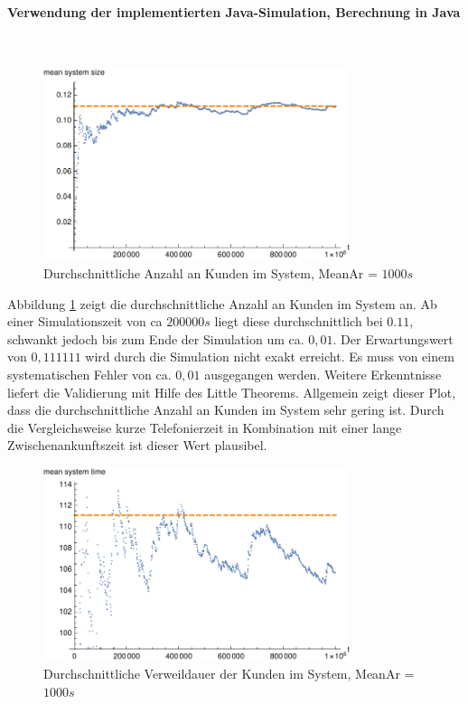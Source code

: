 \paragraph{Verwendung der implementierten Java-Simulation, Berechnung in Java}
\label{JavaOnePhone1000}
\\
\begin{figure}[htpb]
	\centering
	\includegraphics[width=0.8\textwidth]{abbildungen/1_Phone/Arrival_1000_Serve_100_dur_1000000_Skip_0/MeanSystemSize.pdf}
	\caption{Durchschnittliche Anzahl an Kunden im System, MeanAr = $1000s$}
	\label{fig:meanSystemSize1000}
\end{figure}

Abbildung \ref{fig:meanSystemSize1000} zeigt die durchschnittliche Anzahl an Kunden im System an. Ab einer Simulationszeit von ca $200000s$ liegt diese durchschnittlich bei $0.11$, schwankt jedoch bis zum Ende der Simulation um ca. $0,01$. Der Erwartungswert von $0,111111$ wird durch die Simulation nicht exakt erreicht. Es muss von einem systematischen Fehler von ca. $0,01$ ausgegangen werden. Weitere Erkenntnisse liefert die Validierung mit Hilfe des Little Theorems. Allgemein zeigt dieser Plot, dass die durchschnittliche Anzahl an Kunden im System sehr gering ist. Durch die Vergleichsweise kurze Telefonierzeit in Kombination mit einer lange Zwischenankunftszeit ist dieser Wert plausibel.

\begin{figure}[htpb]
	\centering
	\includegraphics[width=0.8\textwidth]{abbildungen/1_Phone/Arrival_1000_Serve_100_dur_1000000_Skip_0/MeanSystemTime.pdf}
	\caption{Durchschnittliche Verweildauer der Kunden im System, MeanAr = $1000s$}
	\label{fig:meanSystemTime1000}
\end{figure}

